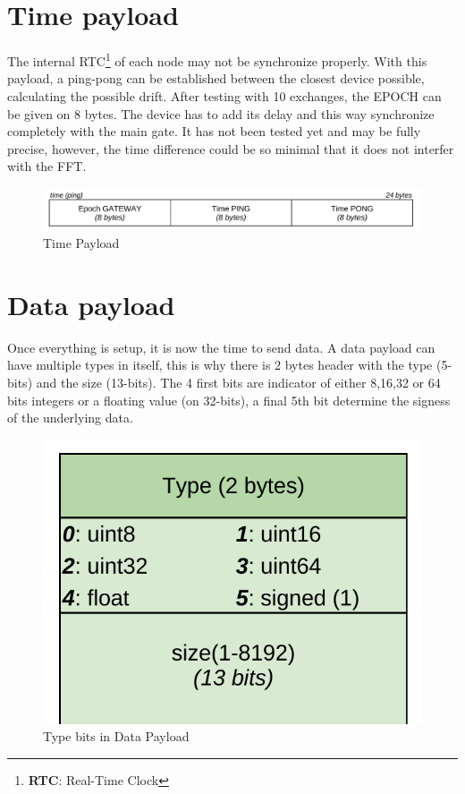 \documentclass[
	a4paper,
	10pt,
	unnumberedsections,
	twoside,
]{LTJournalArticle}
\begin{document}
\section{Time payload}\label{sec:time-payload}
The internal RTC\footnote{\textbf{RTC}: Real-Time Clock} of each node may not be synchronize properly. With this payload, a ping-pong can be established between the closest device possible, calculating the possible drift. After testing with 10 exchanges, the EPOCH can be given on 8 bytes. The device has to add its delay and this way synchronize completely with the main gate. It has not been tested yet and may be fully precise, however, the time difference could be so minimal that it does not interfer with the FFT.
\begin{figure}[H]
    \centering
    \includegraphics[width=1\linewidth]{img/time.png}
    \caption{Time Payload}
    \label{fig:time}
\end{figure}

\section{Data payload} \label{sec:data-payload}
Once everything is setup, it is now the time to send data. A data payload can have multiple types in itself, this is why there is 2 bytes header with the type (5-bits) and the size (13-bits). The 4 first bits are indicator of either 8,16,32 or 64 bits integers or a floating value (on 32-bits), a final 5th bit determine the signess of the underlying data.
\begin{figure}[H]
    \centering
    \includegraphics[width=0.6\linewidth]{img/type_bits.png}
    \caption{Type bits in Data Payload}
    \label{fig:type-bits}
\end{figure}
\end{document}
